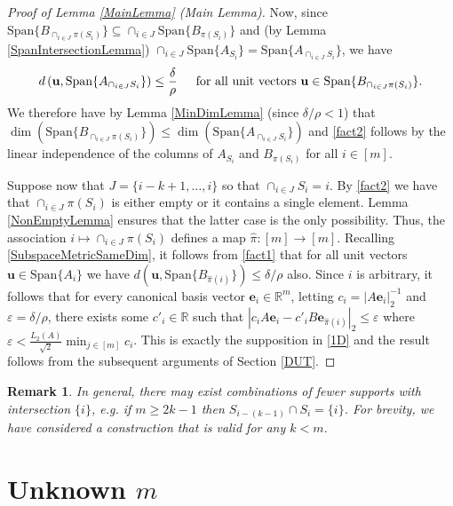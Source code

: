 \documentclass[journal, onecolumn]{IEEEtran}
\newtheorem{remark}{Remark}
\begin{document}
\begin{proof}[Proof of Lemma \ref{MainLemma} (Main Lemma)]
Now, since \mbox{$\text{Span}\{B_{\cap_{i \in J}\pi(S_i)}\} \subseteq \cap_{i \in J} \text{Span}\{B_{\pi(S_i)}\}$} and (by Lemma \ref{SpanIntersectionLemma}) $\cap_{i \in J}  \text{Span}\{A_{S_i}\} = \text{Span}\{A_{\cap_{i \in J}  S_i}\}$, we have
\begin{align}\label{fact1}
d\left( \mathbf{u}, \text{Span}\{A_{\cap_{i \in J} S_i}\} \right) \leq \frac{\delta}{\rho} \indent \text{for all unit vectors } \mathbf{u} \in \text{Span}\{B_{\cap_{i \in J}\pi(S_i)}\}.
\end{align}
We therefore have by Lemma \ref{MinDimLemma} (since $\delta/\rho < 1$) that $\dim(\text{Span}\{B_{\cap_{i \in J}\pi(S_i)}\}) \leq \dim(\text{Span}\{A_{\cap_{i \in J} S_i}\})$ and \eqref{fact2} follows by the linear independence of the columns of $A_{S_i}$ and $B_{\pi(S_i)}$ for all $i \in [m]$.

Suppose now that $J = \{i-k+1, \ldots, i\}$ so that $\cap_{i \in J} S_i = i$. By \eqref{fact2} we have that $\cap_{i \in J} \pi(S_i)$ is either empty or it contains a single element. Lemma \ref{NonEmptyLemma} ensures that the latter case is the only possibility. Thus, the association $i \mapsto \cap_{i \in J} \pi(S_i)$ defines a map $\hat \pi: [m] \to [m]$. Recalling \eqref{SubspaceMetricSameDim}, it follows from \eqref{fact1} that for all unit vectors $\mathbf{u} \in \text{Span}\{A_i\}$ we have $d\left( \mathbf{u}, \text{Span}\{B_{\hat \pi(i)}\}\right) \leq \delta/\rho$ also. Since $i$ is arbitrary, it follows that for every canonical basis vector $\mathbf{e}_i \in \mathbb{R}^m$, letting $c_i = |A\mathbf{e}_i|_2^{-1}$ and $\varepsilon = \delta/\rho$, there exists some $c'_i \in \mathbb{R}$ such that $|c_iA\mathbf{e}_i - c'_iB\mathbf{e}_{\hat \pi(i)}|_2 \leq \varepsilon$ where $\varepsilon < \frac{L_2(A)}{\sqrt{2}} \min_{j \in [m]} c_i$. This is exactly the supposition in \eqref{1D} and the result follows from the subsequent arguments of Section \ref{DUT}. 
\end{proof}

\begin{remark} In general, there may exist combinations of fewer supports with intersection $\{i\}$, e.g. if $m \geq 2k-1$ then $S_{i - (k-1)} \cap S_i = \{i\}$. For brevity, we have considered a construction that is valid for any $k < m$.
\end{remark}


\section{Unknown $m$}\label{mleqmAppendix}
\end{document}
